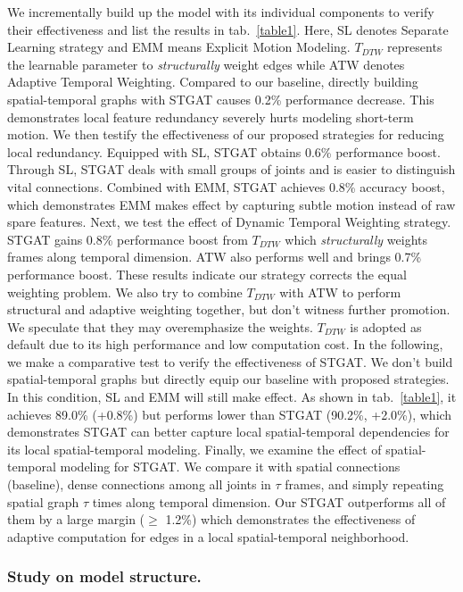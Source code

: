 \documentclass[runningheads]{llncs}
\begin{document}
We incrementally build up the model with its individual components to verify their effectiveness and list the results in tab.~\ref{table1}. Here, SL denotes Separate Learning strategy and EMM means Explicit Motion Modeling. $T_{DTW}$ represents the learnable parameter to \textit{structurally} weight edges while ATW denotes Adaptive Temporal Weighting. Compared to our baseline, directly building spatial-temporal graphs with STGAT causes 0.2\% performance decrease. This demonstrates local feature redundancy severely hurts modeling short-term motion. We then testify the effectiveness of our proposed strategies for reducing local redundancy. Equipped with SL, STGAT obtains 0.6\% performance boost. Through SL, STGAT deals with small groups of joints and is easier to distinguish vital connections. Combined with EMM, STGAT achieves 0.8\% accuracy boost, which demonstrates EMM makes effect by capturing subtle motion instead of raw spare features. Next, we test the effect of Dynamic Temporal Weighting strategy. STGAT gains 0.8\% performance boost from $T_{DTW}$ which \textit{structurally} weights frames along temporal dimension. ATW also performs well and brings 0.7\% performance boost. These results indicate our strategy corrects the equal weighting problem. We also try to combine $T_{DTW}$ with ATW to perform structural and adaptive weighting together, but don't witness further promotion. We speculate that they may overemphasize the weights. $T_{DTW}$ is adopted as default due to its high performance and low computation cost. In the following, we make a comparative test to verify the effectiveness of STGAT. We don't build spatial-temporal graphs but directly equip our baseline with proposed strategies. In this condition, SL and EMM will still make effect. As shown in tab.~\ref{table1}, it achieves 89.0\% (+0.8\%) but performs lower than STGAT (90.2\%, +2.0\%), which demonstrates STGAT can better capture local spatial-temporal dependencies for its local spatial-temporal modeling. Finally, we examine the effect of spatial-temporal modeling for STGAT. We compare it with spatial connections (baseline), dense connections among all joints in $\tau$ frames, and simply repeating spatial graph $\tau$ times along temporal dimension. Our STGAT outperforms all of them by a large margin ($\geq$ 1.2\%) which demonstrates the effectiveness of adaptive computation for edges in a local spatial-temporal neighborhood. 
\subsubsection{Study on model structure.}
\end{document}
